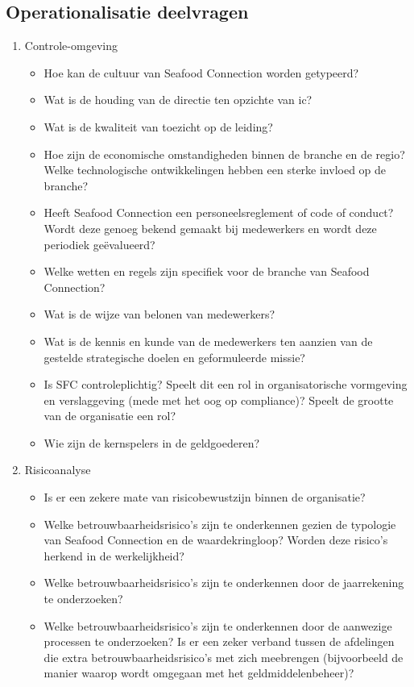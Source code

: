 \subsection{Operationalisatie deelvragen}
\begin{enumerate}
    \item Controle-omgeving
        \begin{itemize}
            \item Hoe kan de cultuur van Seafood Connection worden getypeerd?
            \item Wat is de houding van de directie ten opzichte van \gls{ic}?
            \item Wat is de kwaliteit van toezicht op de leiding?
            \item Hoe zijn de economische omstandigheden binnen de branche en de regio? Welke technologische ontwikkelingen hebben een sterke invloed op de branche?
            \item Heeft Seafood Connection een personeelsreglement of code of conduct? Wordt deze genoeg bekend gemaakt bij medewerkers en wordt deze periodiek geëvalueerd?
            \item Welke wetten en regels zijn specifiek voor de branche van Seafood Connection?
            \item Wat is de wijze van belonen van medewerkers?
            \item Wat is de kennis en kunde van de medewerkers ten aanzien van de gestelde strategische doelen en geformuleerde missie?
            \item Is SFC controleplichtig? Speelt dit een rol in organisatorische vormgeving en verslaggeving (mede met het oog op compliance)? Speelt de grootte van de organisatie een rol?
            \item Wie zijn de kernspelers in de \gls{geldgoederen}?
        \end{itemize}
    \item Risicoanalyse
        \begin{itemize}
            \item Is er een zekere mate van risicobewustzijn binnen de organisatie?
            \item Welke betrouwbaarheidsrisico's zijn te onderkennen gezien de typologie van Seafood Connection en de waardekringloop? Worden deze risico's herkend in de werkelijkheid?
            \item Welke betrouwbaarheidsrisico's zijn te onderkennen door de jaarrekening te onderzoeken?
            \item Welke betrouwbaarheidsrisico's zijn te onderkennen door de aanwezige processen te onderzoeken? Is er een zeker verband tussen de afdelingen die extra betrouwbaarheidsrisico's met zich meebrengen (bijvoorbeeld de manier waarop wordt omgegaan met het geldmiddelenbeheer)?

\end{itemize}
\end{enumerate}
